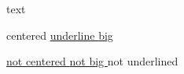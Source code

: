 


\label{0}


text 
\begin{center}
 centered \uline{ underline {\large  big }}
\end{center}
\uline{{\large  not centered } not big } not underlined




